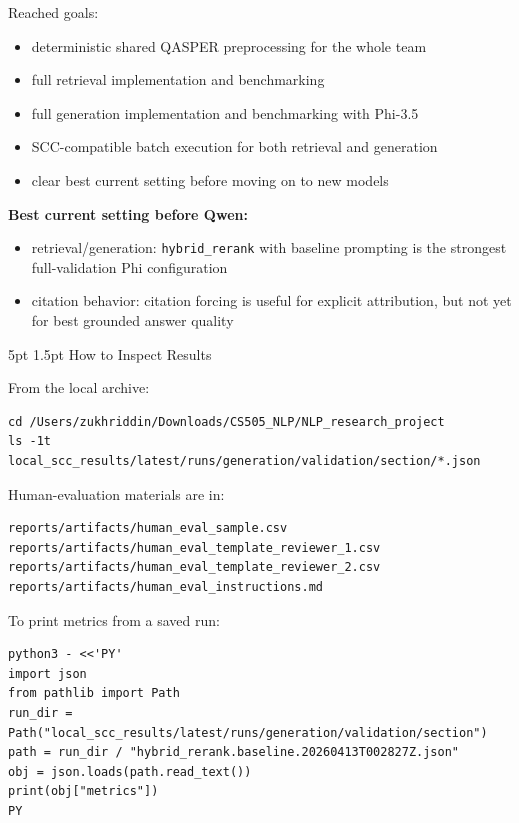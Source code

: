 \documentclass[11pt,letterpaper]{article}
\makeatletter
\renewcommand{\section}{\@startsection{section}{1}{\z@}%
  {5pt \@plus 1pt \@minus 1pt}{1.5pt}%
  {\normalfont\normalsize\bfseries}}
\makeatother
\begin{document}
Reached goals:

\begin{itemize}
\item deterministic shared QASPER preprocessing for the whole team
\item full retrieval implementation and benchmarking
\item full generation implementation and benchmarking with Phi-3.5
\item SCC-compatible batch execution for both retrieval and generation
\item clear best current setting before moving on to new models
\end{itemize}

\textbf{Best current setting before Qwen:}

\begin{itemize}
\item retrieval/generation: \texttt{hybrid\_rerank} with baseline prompting is the strongest full-validation Phi configuration
\item citation behavior: citation forcing is useful for explicit attribution, but not yet for best grounded answer quality
\end{itemize}

\section{How to Inspect Results}

From the local archive:

\begin{verbatim}
cd /Users/zukhriddin/Downloads/CS505_NLP/NLP_research_project
ls -1t local_scc_results/latest/runs/generation/validation/section/*.json
\end{verbatim}

Human-evaluation materials are in:

\begin{verbatim}
reports/artifacts/human_eval_sample.csv
reports/artifacts/human_eval_template_reviewer_1.csv
reports/artifacts/human_eval_template_reviewer_2.csv
reports/artifacts/human_eval_instructions.md
\end{verbatim}

To print metrics from a saved run:

\begin{verbatim}
python3 - <<'PY'
import json
from pathlib import Path
run_dir = Path("local_scc_results/latest/runs/generation/validation/section")
path = run_dir / "hybrid_rerank.baseline.20260413T002827Z.json"
obj = json.loads(path.read_text())
print(obj["metrics"])
PY
\end{verbatim}
\end{document}
